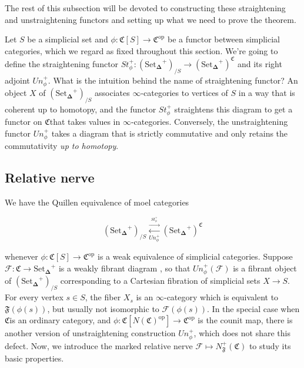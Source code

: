 \documentclass[12pt]{amsart}
\newcommand{\8}{\ensuremath{\infty}}
\newcommand{\C}{\ensuremath{\mathfrak{C}}}
\newcommand{\SSet}{\ensuremath{\text{Set}_{\boldsymbol{\Delta}}}}
\newcommand{\op}[1]{\ensuremath{{#1}^{\text{op}}}}
\newcommand{\adj}[2]{\ensuremath{\overset{\overset{#1}{ \rightarrow}}{\underset{#2}{\leftarrow}}}}
\begin{document}
The rest of this subsection will be devoted to constructing these straightening and unstraightening functors and setting up what we need to prove the theorem.

Let $S$ be a simplicial set and $\phi: \mathfrak{C}[S] \rightarrow \op\C$ be a functor between simplicial categories, which we regard as fixed throughout this section. We're going to define the straightening functor $St_\phi^+: (\SSet^+)_{/S} \rightarrow (\SSet^+)^\C$ and its right adjoint $Un_\phi^+$. What is the intuition behind the name of straightening functor? An object $X$ of $(\SSet^+)_{/S}$ associates \8-categories to vertices of $S$ in a way that is coherent up to homotopy, and the functor $St_\phi^+$ straightens this diagram to get a functor on \C that takes values in \8-categories. Conversely, the unstraightening functor $Un_\phi^+$ takes a diagram that is strictly commutative and only retains the commutativity \emph{up to homotopy}.

\subsection{Relative nerve}

We have the Quillen equivalence of moel categories

$$
  (\SSet^+)_{/S} \adj{St^+_\phi}{Un^+_\phi} (\SSet^+)^\C
$$

whenever $\phi: \mathfrak{C}[S] \rightarrow \op\C$ is a weak equivalence of simplicial categories. Suppose $\mathcal{F} : \C \rightarrow \SSet^{+}$ is a weakly fibrant diagram , so that $Un_\phi^+(\mathcal{F})$ is a fibrant object of $(\SSet^+)_{/S}$ corresponding to a Cartesian fibration of simplicial sets $X \rightarrow S$. For every vertex $s \in S$, the fiber $X_s$ is an \8-category which is equivalent to $\mathfrak{F}(\phi(s))$, but usually not isomorphic to $\mathcal{F}(\phi(s))$. In the special case when \C is an ordinary category, and $\phi: \mathfrak{C}[\op{N(\C)}] \rightarrow \op\C$ is the counit map, there is another version of unstraightening construction $Un_\phi^+$, which does not share this defect. Now, we introduce the marked relative nerve $\mathcal{F} \mapsto N_\mathfrak{F}^+(\C)$ to study its basic properties.
\end{document}
